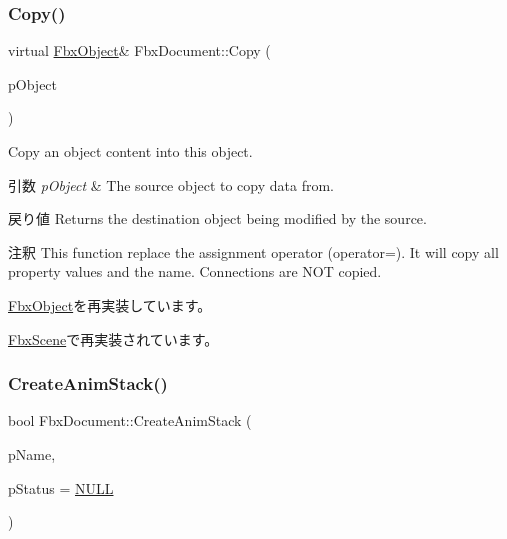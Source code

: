 \mbox{\label{class_fbx_document_a6a345cc64e4ee39a6fd719b56d50dfac}} 
\subsubsection{\texorpdfstring{Copy()}{Copy()}}
{\footnotesize\ttfamily virtual \hyperlink{class_fbx_object}{Fbx\+Object}\& Fbx\+Document\+::\+Copy (\begin{DoxyParamCaption}\item[{const \hyperlink{class_fbx_object}{Fbx\+Object} \&}]{p\+Object }\end{DoxyParamCaption})\hspace{0.3cm}{\ttfamily [virtual]}}

Copy an object content into this object. 
\begin{DoxyParams}{引数}
{\em p\+Object} & The source object to copy data from. \\
\hline
\end{DoxyParams}
\begin{DoxyReturn}{戻り値}
Returns the destination object being modified by the source. 
\end{DoxyReturn}
\begin{DoxyRemark}{注釈}
This function replace the assignment operator (operator=). It will copy all property values and the name. Connections are N\+OT copied. 
\end{DoxyRemark}


\hyperlink{class_fbx_object_a0c0c5adb38284d14bb82c04d54504a3e}{Fbx\+Object}を再実装しています。



\hyperlink{class_fbx_scene_ab78703621f17898a3caf23b589821609}{Fbx\+Scene}で再実装されています。

\mbox{\label{class_fbx_document_a8180ba3b0b34f301703d77adc912a3a5}} 
\subsubsection{\texorpdfstring{Create\+Anim\+Stack()}{CreateAnimStack()}}
{\footnotesize\ttfamily bool Fbx\+Document\+::\+Create\+Anim\+Stack (\begin{DoxyParamCaption}\item[{const char $\ast$}]{p\+Name,  }\item[{\hyperlink{class_fbx_status}{Fbx\+Status} $\ast$}]{p\+Status = {\ttfamily \hyperlink{fbxarch_8h_a070d2ce7b6bb7e5c05602aa8c308d0c4}{N\+U\+LL}} }\end{DoxyParamCaption})}

